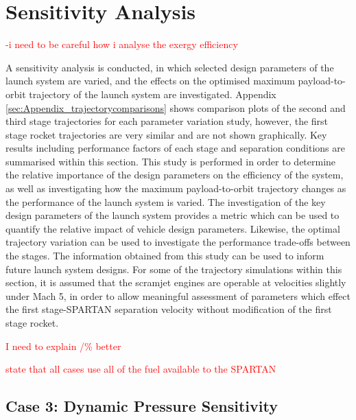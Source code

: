\section{Sensitivity Analysis}\label{sec:sensitivityNoReturn}

\textcolor{red}{
	-i need to be careful how i analyse the exergy efficiency }

A sensitivity analysis is conducted, in which selected design parameters of the launch system are varied, and the effects on the optimised maximum payload-to-orbit trajectory of the launch system are investigated. Appendix \ref{sec:Appendix_trajectorycomparisons} shows comparison plots of the second and third stage trajectories for each parameter variation study, however, the first stage rocket trajectories are very similar and are not shown graphically. Key results including performance factors of each stage and separation conditions are summarised within this section.
This study is performed in order to determine the relative importance of the design parameters on the efficiency of the system, as well as investigating how the maximum payload-to-orbit trajectory changes as the performance of the launch system is varied. The investigation of the key design parameters of the launch system provides a metric which can be used to quantify the relative impact of vehicle design parameters. Likewise, the optimal trajectory variation can be used to investigate the performance trade-offs between the stages. 
The information obtained from this study can be used to inform future launch system designs. 
For some of the trajectory simulations within this section, it is assumed that the scramjet engines are operable at velocities slightly under Mach 5, in order to allow meaningful assessment of parameters which effect the first stage-SPARTAN separation velocity without modification of the first stage rocket.





\textcolor{red}{I need to explain /\% better}

\textcolor{red}{state that all cases use all of the fuel available to the SPARTAN}

\subsection{Case 3: Dynamic Pressure Sensitivity}\label{sec:qvariation}

